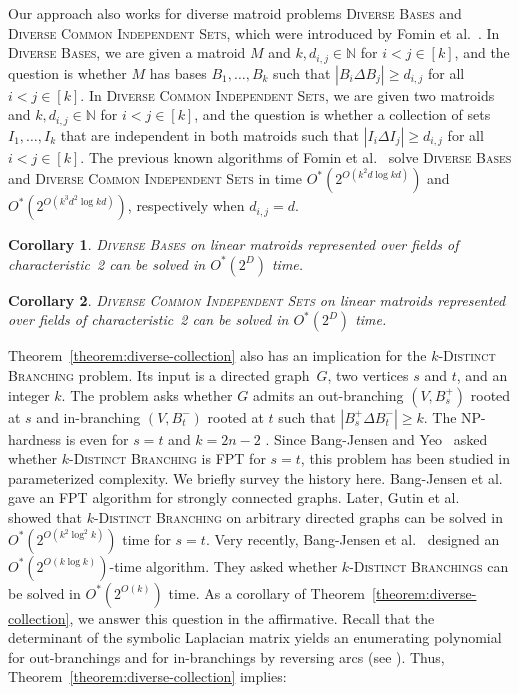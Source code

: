 \documentclass[10pt,a4paper]{article}
\newtheorem{corollary}{Corollary}[section]
\newcommand{\N}{\ensuremath{\mathbb N}\xspace}
\begin{document}
Our approach also works for diverse matroid problems \textsc{Diverse Bases} and \textsc{Diverse Common Independent Sets}, which were introduced by Fomin et al.~\cite{FominGPPS24}.
In \textsc{Diverse Bases}, we are given a matroid $M$ and $k, d_{i,j} \in \N$ for $i < j \in [k]$, and the question is whether $M$ has bases $B_1, \dots, B_k$ such that $|B_i \Delta B_j| \ge d_{i, j}$ for all $i < j \in [k]$.
In \textsc{Diverse Common Independent Sets}, we are given two matroids and $k, d_{i,j} \in \N$ for $i < j \in [k]$, and the question is whether a collection of sets $I_1, \dots, I_k$ that are independent in both matroids such that $|I_i \Delta I_j| \ge d_{i,j}$ for all $i < j \in [k]$.
The previous known algorithms of Fomin et al.~\cite{FominGPPS24} solve \textsc{Diverse Bases} and \textsc{Diverse Common Independent Sets} in time $O^*(2^{O(k^2 d \log kd)})$ and $O^*(2^{O(k^3 d^2 \log kd)})$, respectively when $d_{i,j} = d$.

\begin{corollary}
  \textsc{Diverse Bases} on linear matroids represented over fields of characteristic~2 can be solved in $O^*(2^D)$ time.
\end{corollary}
\begin{corollary}
  \textsc{Diverse Common Independent Sets} on linear matroids represented over fields of characteristic~2 can be solved in $O^*(2^D)$ time.
\end{corollary}

Theorem~\ref{theorem:diverse-collection} also has an implication for the \textsc{$k$-Distinct Branching} problem.
Its input is a directed graph~$G$, two vertices $s$ and $t$, and an integer $k$.
The problem asks whether $G$ admits an out-branching $(V, B_s^+)$ rooted at $s$ and in-branching $(V, B_t^-)$ rooted at $t$ such that $|B_s^+ \Delta B_t^-| \ge k$.
The NP-hardness is even for $s = t$ and $k = 2n - 2$ \cite{Bang-Jensen91}.
Since Bang-Jensen and Yeo~\cite{Bang-JensenY08} asked whether \textsc{$k$-Distinct Branching} is FPT for $s = t$, this problem has been studied in parameterized complexity.
We briefly survey the history here.
Bang-Jensen et al.~\cite{Bang-JensenSS16} gave an FPT algorithm for strongly connected graphs.
Later, Gutin et al.~\cite{GutinRW18} showed that \textsc{$k$-Distinct Branching} on arbitrary directed graphs can be solved in $O^*(2^{O(k^2 \log^2 k)})$ time for $s = t$.
Very recently, Bang-Jensen et al.~\cite{Bang-JensenK021} designed an $O^*(2^{O(k \log k)})$-time algorithm.
They asked whether \textsc{$k$-Distinct Branchings} can be solved in $O^*(2^{O(k)})$ time.
As a corollary of Theorem~\ref{theorem:diverse-collection}, we answer this question in the affirmative.
Recall that the determinant of the symbolic Laplacian matrix yields an enumerating polynomial for out-branchings and for in-branchings by reversing arcs (see \cite{BjorklundKK17directed,gessel95algebraic}).
Thus, Theorem~\ref{theorem:diverse-collection} implies:
\end{document}
